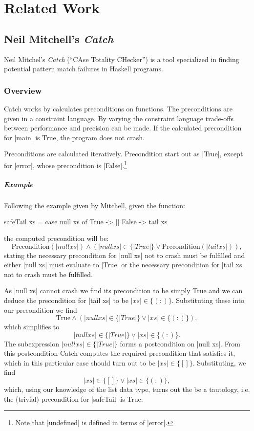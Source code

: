 \chapter{Related Work}\label{chaprelatedwork}


\section{Neil Mitchell's \emph{Catch}}

Neil Mitchel's \emph{Catch} (``CAse Totality CHecker'') \cite{Mitchell} is a tool specialized in finding potential pattern match failures in Haskell programs.

\subsection{Overview}

Catch works by calculates preconditions on functions. The preconditions are given in a constraint language. By varying the constraint language trade-offs between performance and precision can be made. If the calculated precondition for |main| is True, the program does not crash.

Preconditions are calculated iteratively. Precondition start out as |True|, except for |error|, whose precondition is |False|.\footnote{Note that |undefined| is defined in terms of |error|.}

\paragraph{Example} Following the example given by Mitchell, given the function:
\begin{code}
safeTail xs =  case null xs of
                  True   -> []
                  False  -> tail xs
\end{code}
the computed precondition will be:
\[ \textrm{Precondition}(|null xs|) \land (|null xs| \in \{|True|\} \lor \textrm{Precondition}(|tail xs|)), \]
stating the necessary precondition for |null xs| not to crash must be fulfilled and either |null xs| must evaluate to |True| or the necessary precondition for |tail xs| not to crash must be fulfilled.

As |null xs| cannot crash we find its precondition to be simply True and we can deduce the precondition for |tail xs| to be $|xs|\in\{(:)\}$. Substituting these into our precondition we find
\[ \textrm{True} \land (|null xs| \in \{|True|\} \lor |xs|\in\{(:)\}), \]
which simplifies to
\[ |null xs| \in \{|True|\} \lor |xs|\in\{(:)\}. \]
The subexpression  $|null xs| \in \{|True|\}$ forms a postcondition on |null xs|. From this postcondition Catch computes the required precondition that satisfies it, which in this particular case should turn out to be $|xs|\in\{[]\}$. Substituting, we find
\[ |xs|\in\{[]\} \lor |xs|\in\{(:)\}, \]
which, using our knowledge of the list data type, turns out the be a tautology, i.e. the (trivial) precondition for |safeTail| is True.

